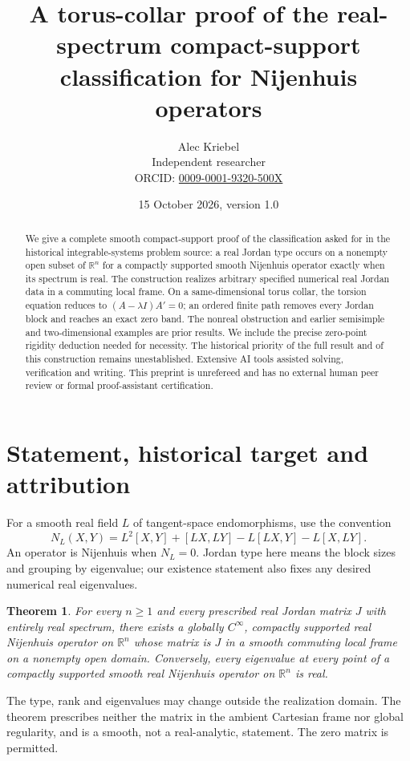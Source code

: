 \documentclass[11pt]{article}
\title{A torus-collar proof of the real-spectrum compact-support classification for Nijenhuis operators}
\author{Alec Kriebel\\Independent researcher\\\small ORCID: \href{https://orcid.org/0009-0001-9320-500X}{0009-0001-9320-500X}}
\date{15 October 2026, version 1.0}
\newtheorem{theorem}{Theorem}
\newcommand{\R}{\mathbb R}
\begin{document}
\maketitle
\begin{abstract}
We give a complete smooth compact-support proof of the classification asked
for in the historical integrable-systems problem source: a real Jordan type
occurs on a nonempty open subset of $\R^n$ for a compactly supported smooth
Nijenhuis operator exactly when its spectrum is real. The construction
realizes arbitrary specified numerical real Jordan data in a commuting local
frame. On a same-dimensional torus collar, the torsion equation reduces to
$(A-\lambda I)A'=0$; an ordered finite path removes every Jordan block and
reaches an exact zero band. The nonreal obstruction and earlier semisimple
and two-dimensional examples are prior results. We include the precise
zero-point rigidity deduction needed for necessity. The historical priority
of the full result and of this construction remains unestablished.
Extensive AI tools assisted solving, verification and writing. This preprint
is unrefereed and has no external human peer review or formal
proof-assistant certification.
\end{abstract}

\section{Statement, historical target and attribution}
For a smooth real field $L$ of tangent-space endomorphisms, use the convention
\[
 N_L(X,Y)=L^2[X,Y]+[LX,LY]-L[LX,Y]-L[X,LY].
\]
An operator is Nijenhuis when $N_L=0$. Jordan type here means the block
sizes and grouping by eigenvalue; our existence statement also fixes any
desired numerical real eigenvalues.

\begin{theorem}\label{thm:main}
For every $n\geq1$ and every prescribed real Jordan matrix $J$ with entirely
real spectrum, there exists a globally $C^\infty$, compactly supported real
Nijenhuis operator on $\R^n$ whose matrix is $J$ in a smooth commuting local
frame on a nonempty open domain. Conversely, every eigenvalue at every
point of a compactly supported smooth real Nijenhuis operator on $\R^n$ is
real.
\end{theorem}

The type, rank and eigenvalues may change outside the realization domain.
The theorem prescribes neither the matrix in the ambient Cartesian frame
nor global regularity, and is a smooth, not a real-analytic, statement.
The zero matrix is permitted.
\end{document}
